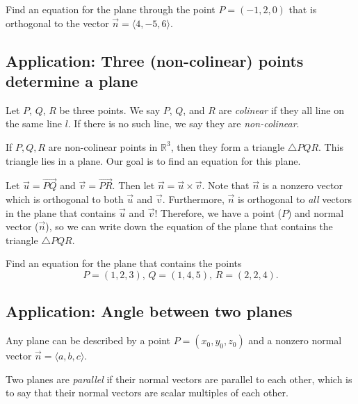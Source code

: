 \pagebreak

\begin{ex}
    Find an equation for the plane through the point $P=(-1,2,0)$ that is orthogonal to the vector $\vec{n}=\langle 4,-5,6\rangle$.
\end{ex}

\vspace{.6in}

\subsection{Application: Three (non-colinear) points determine a plane}
\begin{defn}
    Let $P$, $Q$, $R$ be three points. We say $P$, $Q$, and $R$ are \emph{colinear} if they all line on the same line $l$. If there is no such line, we say they are \emph{non-colinear}.
\end{defn}

\vspace{.8in} 

If $P,Q,R$ are non-colinear points in $\mathbb{R}^3$, then they form a triangle $\triangle PQR$. This triangle lies in a plane. Our goal is to find an equation for this plane.

Let $\vec{u}=\vec{PQ}$ and $\vec{v}=\vec{PR}$. Then let $\vec{n}=\vec{u}\times\vec{v}$. Note that $\vec{n}$ is a nonzero vector which is orthogonal to both $\vec{u}$ and $\vec{v}$. Furthermore, $\vec{n}$ is orthogonal to \emph{all} vectors in the plane that contains $\vec{u}$ and $\vec{v}$! Therefore, we have a point ($P$) and normal vector ($\vec{n}$), so we can write down the equation of the plane that contains the triangle $\triangle PQR$.

\begin{ex}
    Find an equation for the plane that contains the points \[P=(1,2,3),\, Q=(1,4,5),\, R=(2,2,4).\]
\end{ex}

\vfill

\pagebreak 

\subsection{Application: Angle between two planes}
Any plane can be described by a point $P=(x_0,y_0,z_0)$ and a nonzero normal vector $\vec{n}=\langle a,b,c\rangle$.

\begin{framed}
    Two planes are \emph{parallel} if their normal vectors are parallel to each other, which is to say that their normal vectors are scalar multiples of each other.
\end{framed}

